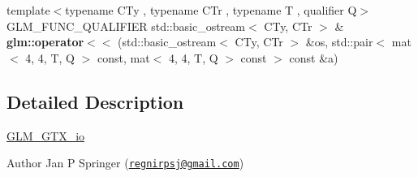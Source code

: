 \begin{DoxyCompactItemize}
\item 
{\footnotesize template$<$typename C\+Ty , typename C\+Tr , typename T , qualifier Q$>$ }\\G\+L\+M\+\_\+\+F\+U\+N\+C\+\_\+\+Q\+U\+A\+L\+I\+F\+I\+ER std\+::basic\+\_\+ostream$<$ C\+Ty, C\+Tr $>$ \& {\bfseries glm\+::operator$<$$<$} (std\+::basic\+\_\+ostream$<$ C\+Ty, C\+Tr $>$ \&os, std\+::pair$<$ mat$<$ 4, 4, T, Q $>$ const, mat$<$ 4, 4, T, Q $>$ const $>$ const \&a)
\end{DoxyCompactItemize}


\subsection{Detailed Description}
\hyperlink{group__gtx__io}{G\+L\+M\+\_\+\+G\+T\+X\+\_\+io}

\begin{DoxyAuthor}{Author}
Jan P Springer (\href{mailto:regnirpsj@gmail.com}{\tt regnirpsj@gmail.\+com}) 
\end{DoxyAuthor}

